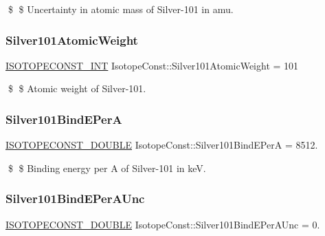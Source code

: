 \$ \$ Uncertainty in atomic mass of Silver-\/101 in amu. \mbox{\label{group___isotope_const-_silver-_ag101_ga50153b868b13672c2494b84c5771b939}} 
\subsubsection{\texorpdfstring{Silver101\+Atomic\+Weight}{Silver101AtomicWeight}}
{\footnotesize\ttfamily \mbox{\hyperlink{group___isotope_const-_macros_ga5f18360b3e99483a35c32d789e62621c}{I\+S\+O\+T\+O\+P\+E\+C\+O\+N\+S\+T\+\_\+\+I\+NT}} Isotope\+Const\+::\+Silver101\+Atomic\+Weight = 101}

\$ \$ Atomic weight of Silver-\/101. \mbox{\label{group___isotope_const-_silver-_ag101_gadd96adcbfcc113ee4738959310aa1117}} 
\subsubsection{\texorpdfstring{Silver101\+Bind\+E\+PerA}{Silver101BindEPerA}}
{\footnotesize\ttfamily \mbox{\hyperlink{group___isotope_const-_macros_ga8f45a7272ce02c0b4c65c44636ed719a}{I\+S\+O\+T\+O\+P\+E\+C\+O\+N\+S\+T\+\_\+\+D\+O\+U\+B\+LE}} Isotope\+Const\+::\+Silver101\+Bind\+E\+PerA = 8512.}

\$ \$ Binding energy per A of Silver-\/101 in keV. \mbox{\label{group___isotope_const-_silver-_ag101_ga72bb898adcf74aa5e59d75677e4b18c3}} 
\subsubsection{\texorpdfstring{Silver101\+Bind\+E\+Per\+A\+Unc}{Silver101BindEPerAUnc}}
{\footnotesize\ttfamily \mbox{\hyperlink{group___isotope_const-_macros_ga8f45a7272ce02c0b4c65c44636ed719a}{I\+S\+O\+T\+O\+P\+E\+C\+O\+N\+S\+T\+\_\+\+D\+O\+U\+B\+LE}} Isotope\+Const\+::\+Silver101\+Bind\+E\+Per\+A\+Unc = 0.}

